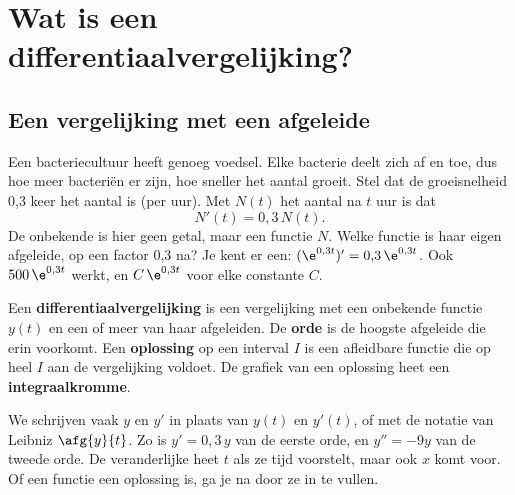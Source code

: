 \begin{oefeningen}[Start]

\end{oefeningen}

\section{Wat is een differentiaalvergelijking?}

\subsection{Een vergelijking met een afgeleide}

Een bacteriecultuur heeft genoeg voedsel. Elke bacterie deelt zich af en toe, dus hoe meer bacteriën er zijn, hoe sneller het aantal groeit. Stel dat de groeisnelheid 0,3 keer het aantal is (per uur). Met $N(t)$ het aantal na $t$ uur is dat
\[
N'(t) = 0{,}3\, N(t) .
\]
De onbekende is hier geen getal, maar een functie $N$. Welke functie is haar eigen afgeleide, op een factor 0,3 na? Je kent er een: $(\e^{0{,}3t})' = 0{,}3\,\e^{0{,}3t}$. Ook $500\,\e^{0{,}3t}$ werkt, en $C\,\e^{0{,}3t}$ voor elke constante $C$.

\begin{theorie}
Een \textbf{\textcolor{accent}{differentiaalvergelijking}} is een vergelijking met een onbekende functie $y(t)$ en een of meer van haar afgeleiden. De \textbf{\textcolor{accent}{orde}} is de hoogste afgeleide die erin voorkomt. Een \textbf{\textcolor{accent}{oplossing}} op een interval $I$ is een afleidbare functie die op heel $I$ aan de vergelijking voldoet. De grafiek van een oplossing heet een \textbf{\textcolor{accent}{integraalkromme}}.
\end{theorie}

We schrijven vaak $y$ en $y'$ in plaats van $y(t)$ en $y'(t)$, of met de notatie van Leibniz $\afg{y}{t}$. Zo is $y' = 0{,}3\,y$ van de eerste orde, en $y'' = -9y$ van de tweede orde. De veranderlijke heet $t$ als ze tijd voorstelt, maar ook $x$ komt voor. Of een functie een oplossing is, ga je na door ze in te vullen.


